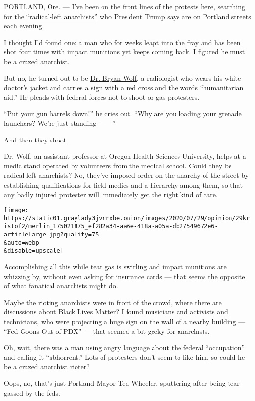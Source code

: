 PORTLAND, Ore. --- I've been on the front lines of the protests here,
searching for the
\href{https://twitter.com/realDonaldTrump/status/1287472054527197190}{``radical-left
anarchists''} who President Trump says are on Portland streets each
evening.

I thought I'd found one: a man who for weeks leapt into the fray and has
been shot four times with impact munitions yet keeps coming back. I
figured he must be a crazed anarchist.

But no, he turned out to be \href{https://twitter.com/BryanWolfPDX}{Dr.
Bryan Wolf}, a radiologist who wears his white doctor's jacket and
carries a sign with a red cross and the words ``humanitarian aid.'' He
pleads with federal forces not to shoot or gas protesters.

``Put your gun barrels down!'' he cries out. ``Why are you loading your
grenade launchers? We're just standing ------''

And then they shoot.

Dr. Wolf, an assistant professor at Oregon Health Sciences University,
helps at a medic stand operated by volunteers from the medical school.
Could they be radical-left anarchists? No, they've imposed order on the
anarchy of the street by establishing qualifications for field medics
and a hierarchy among them, so that any badly injured protester will
immediately get the right kind of care.

\texttt{[image: https://static01.graylady3jvrrxbe.onion/images/2020/07/29/opinion/29kristof2/merlin\_175021875\_ef282a34-aa6e-418a-a05a-db27549672e6-articleLarge.jpg?quality=75\\\&auto=webp\\\&disable=upscale]}

Accomplishing all this while tear gas is swirling and impact munitions
are whizzing by, without even asking for insurance cards --- that seems
the opposite of what fanatical anarchists might do.

Maybe the rioting anarchists were in front of the crowd, where there are
discussions about Black Lives Matter? I found musicians and activists
and technicians, who were projecting a huge sign on the wall of a nearby
building --- ``Fed Goons Out of PDX'' --- that seemed a bit geeky for
anarchists.

Oh, wait, there was a man using angry language about the federal
``occupation'' and calling it ``abhorrent.'' Lots of protesters don't
seem to like him, so could he be a crazed anarchist rioter?

Oops, no, that's just Portland Mayor Ted Wheeler, sputtering after being
tear-gassed by the feds.


